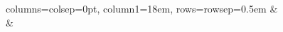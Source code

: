 \begin{enhancedline}
\begin{xiaotis}
\begin{xiaoxiaotis}
\end{xiaoxiaotis}


\begin{xiaoxiaotis}

    \begin{tblr}{columns={colsep=0pt}, column{1}={18em}, rows={rowsep=0.5em}}
         &  \\
         & 
    \end{tblr}

\end{xiaoxiaotis}
\end{xiaotis}
\end{enhancedline}

